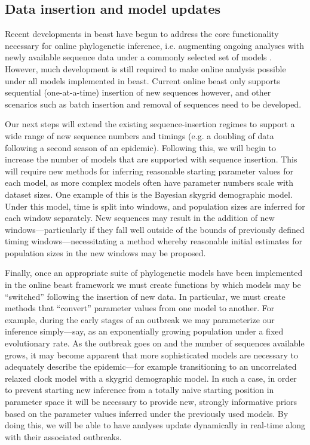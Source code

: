 \subsection{Data insertion and model updates}

Recent developments in \gls{beast} have begun to address the core functionality necessary for online phylogenetic inference, i.e. augmenting ongoing analyses with newly available sequence data under a commonly selected set of models \cite{gill2020online}.
However, much development is still required to make online analysis possible under all models implemented in \gls{beast}.
Current online \gls{beast} only supports sequential (one-at-a-time) insertion of new sequences however, and other scenarios such as batch insertion and removal of sequences need to be developed.

Our next steps will extend the existing sequence-insertion regimes to support a wide range of new sequence numbers and timings (e.g. a doubling of data following a second season of an epidemic).
Following this, we will begin to increase the number of models that are supported with sequence insertion.
This will require new methods for inferring reasonable starting parameter values for each model, as more complex models often have parameter numbers scale with dataset sizes.
One example of this is the Bayesian skygrid demographic model.
Under this model, time is split into windows, and population sizes are inferred for each window separately.
New sequences may result in the addition of new windows---particularly if they fall well outside of the bounds of previously defined timing windows---necessitating a method whereby reasonable initial estimates for population sizes in the new windows may be proposed.

Finally, once an appropriate suite of phylogenetic models have been implemented in the online \gls{beast} framework we must create functions by which models may be ``switched'' following the insertion of new data.
In particular, we must create methods that ``convert'' parameter values from one model to another.
For example, during the early stages of an outbreak we may parameterize our inference simply---say, as an exponentially growing population under a fixed evolutionary rate.
As the outbreak goes on and the number of sequences available grows, it may become apparent that more sophisticated models are necessary to adequately describe the epidemic---for example transitioning to an uncorrelated relaxed clock model with a skygrid demographic model.
In such a case, in order to prevent starting new inference from a totally naive starting position in parameter space it will be necessary to provide new, strongly informative priors based on the parameter values inferred under the previously used models.
By doing this, we will be able to have analyses update dynamically in real-time along with their associated outbreaks.

